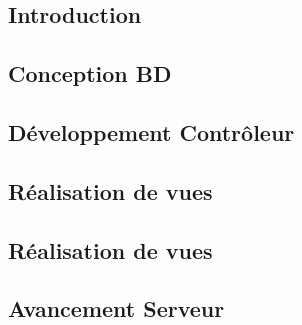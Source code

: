 

\subsection{Introduction}


\subsection{Conception BD}


\subsection{Développement Contrôleur}


\subsection{Réalisation de vues}


\subsection{Réalisation de vues}


\subsection{Avancement Serveur}

